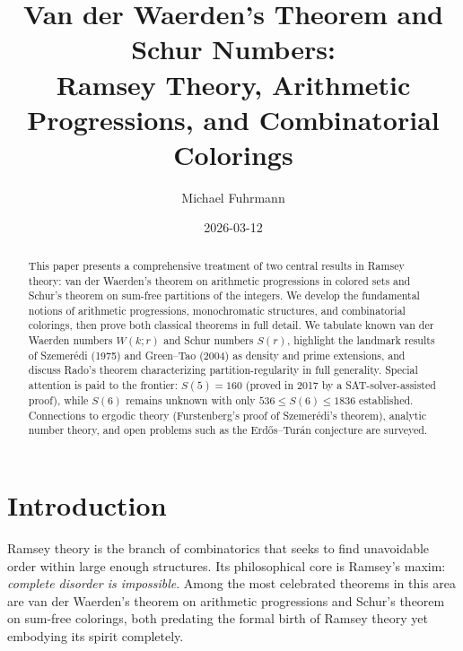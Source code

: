 \documentclass[12pt,a4paper]{amsart}
\theoremstyle{definition}
\begin{document}
\title{Van der Waerden's Theorem and Schur Numbers:\\
Ramsey Theory, Arithmetic Progressions, and Combinatorial Colorings}

\author{Michael Fuhrmann}
\address{Specialist Mathematics Project, Build 145}
\date{2026-03-12}

\begin{abstract}
This paper presents a comprehensive treatment of two central results in Ramsey theory:
van der Waerden's theorem on arithmetic progressions in colored sets and Schur's theorem
on sum-free partitions of the integers. We develop the fundamental notions of arithmetic
progressions, monochromatic structures, and combinatorial colorings, then prove both
classical theorems in full detail. We tabulate known van der Waerden numbers
$W(k;r)$ and Schur numbers $S(r)$, highlight the landmark results of Szemer\'edi (1975)
and Green--Tao (2004) as density and prime extensions, and discuss Rado's theorem
characterizing partition-regularity in full generality. Special attention is paid to
the frontier: $S(5) = 160$ (proved in 2017 by a SAT-solver-assisted proof), while
$S(6)$ remains unknown with only $536 \leq S(6) \leq 1836$ established. Connections
to ergodic theory (Furstenberg's proof of Szemer\'edi's theorem), analytic number theory,
and open problems such as the Erd\H{o}s--Tur\'an conjecture are surveyed.
\end{abstract}

\maketitle

\tableofcontents

\section{Introduction}

Ramsey theory is the branch of combinatorics that seeks to find unavoidable order within
large enough structures. Its philosophical core is Ramsey's maxim: \emph{complete disorder
is impossible}. Among the most celebrated theorems in this area are van der Waerden's
theorem on arithmetic progressions and Schur's theorem on sum-free colorings, both
predating the formal birth of Ramsey theory yet embodying its spirit completely.
\end{document}

